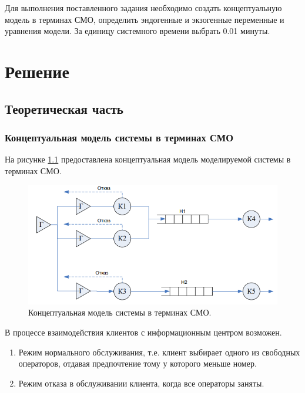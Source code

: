 \documentclass[14pt]{extreport}
\begin{document}
Для выполнения поставленного задания необходимо создать концептуальную модель в терминах СМО, определить эндогенные и экзогенные переменные и уравнения модели. За единицу системного времени выбрать 0.01 минуты.

\chapter{Решение}
\section{Теоретическая часть}

\subsection{Концептуальная модель системы в терминах СМО}

На рисунке \ref{img:model} предоставлена концептуальная модель моделируемой системы в терминах СМО.

\begin{figure}[H]
	\begin{center}
		\includegraphics[scale=0.9]{imgs/model.png}
	\end{center}
	\caption{Концептуальная модель системы в терминах СМО.}
	\label{img:model}
\end{figure}

В процессе взаимодействия клиентов с информационным центром возможен.

\begin{enumerate}
	\item Режим нормального обслуживания, т.е. клиент выбирает одного из свободных операторов, отдавая предпочтение тому у которого меньше номер.
	\item Режим отказа в обслуживании клиента, когда все операторы заняты.
\end{enumerate}
\end{document}
